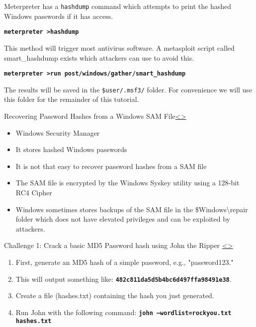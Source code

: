 \documentclass[12pt]{article}
\newcommand{\code}[1]{\texttt{\bfseries#1}}
\newenvironment{instructionblock}{\Large\bgroup}{\egroup}
\newcommand{\bi}{\begin{itemize}}
\newcommand{\ei}{\end{itemize}}
\begin{document}
Meterpreter has a \texttt{hashdump} command which attempts to print the hashed Windows passwords if it has access.

\code{meterpreter \textgreater  hashdump }
\cite{book}

This method will trigger most antivirus software. A metasploit script called smart\_hashdump exists which attackers can use to avoid this.

\code{meterpreter \textgreater run post/windows/gather/smart\_hashdump}

The results will be saved in the \texttt{\$user/.msf3/} folder. For convenience we will use this folder for the remainder of this tutorial.


\pagebreak

\begin{slide}{Recovering Password Hashes from a Windows SAM File}{\hyperref[slide 8]{\textless}\hyperref[slide 10]{\textgreater}}
	\begin{instructionblock}
			\bi
				\item Windows Security Manager
				\item It stores hashed Windows passwords
				\item It is not that easy to recover password hashes from a SAM file
			\ei
				
	\end{instructionblock}
\end{slide}
\vfill
\bi

\item The SAM file is encrypted by the Windows Syskey utility using a 128-bit RC4 Cipher

\item Windows sometimes stores backups of the SAM file in the \$Windows\textbackslash repair folder which does not have elevated privileges and can be exploited by attackers.


\ei\cite{book}

\pagebreak
\begin{slide}{Challenge 1: Crack a basic MD5 Password hash using John the Ripper }{\hyperref[slide 9]{\textless}\hyperref[slide 11]{\textgreater}}
	\begin{instructionblock}\
		\begin{enumerate}
			\item First, generate an MD5 hash of a simple password, e.g., "password123."
			\item This will output something like: \code{482c811da5d5b4bc6d497ffa98491e38}.
			\item Create a file (hashes.txt) containing the hash you just generated.
            \item Run John with the following command: \code{john --wordlist=rockyou.txt hashes.txt}
		\end{enumerate}
	\end{instructionblock}
\end{slide}
\end{document}
